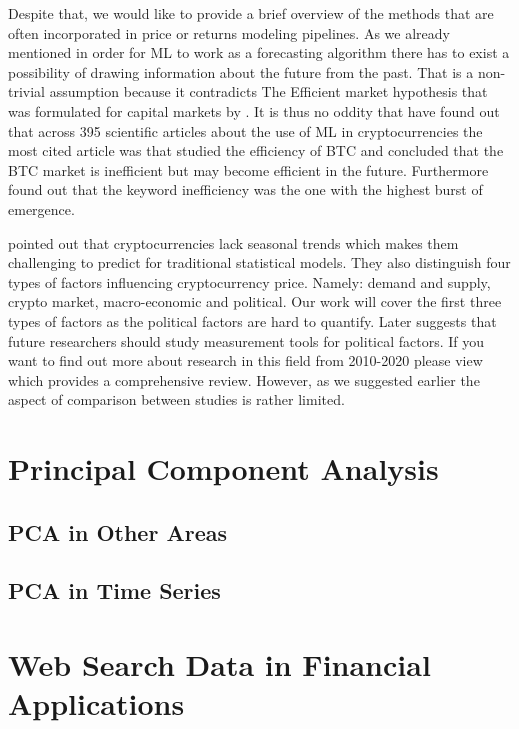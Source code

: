 Despite that, we would like to provide a brief overview
of the methods that are often incorporated in price or returns modeling pipelines.
As we already mentioned in order for \ac{ML} to work as a forecasting
algorithm there has to
exist a possibility of drawing information about the future from the past.
That is a non-trivial assumption because it contradicts The Efficient market 
hypothesis
that was formulated for capital markets by \cite{miller1970efficient}.
It is thus no oddity that \cite{Ren2022} have found out that across 395 scientific
articles about the use of \ac{ML} in cryptocurrencies the most cited 
article was \cite{Urquhart2017} that studied the efficiency of \ac{BTC} and 
concluded that the \ac{BTC} market is inefficient but may become efficient in the future.
Furthermore \cite{Ren2022} found out that the keyword
inefficiency was the one with the highest burst of emergence.


\cite{Khedr2021} pointed out that cryptocurrencies lack seasonal trends
which makes them challenging to predict for traditional statistical models. 
They also distinguish four types of factors influencing cryptocurrency price.
Namely: demand and supply, crypto market, macro-economic and political. 
Our work will cover the first three types of factors as the political factors
are hard to quantify. Later \cite{Ren2022} suggests that future researchers should
study measurement tools for political factors. 
If you want to find out more about research in this
field from 2010-2020 please view \cite{Khedr2021} which provides a comprehensive
review. However, as we suggested 
earlier the aspect of comparison between studies is rather limited.


\section{Principal Component Analysis}
\label{sec:pca}


\subsection{PCA in Other Areas}

\subsection{PCA in Time Series}


\section{Web Search Data in Financial Applications}





